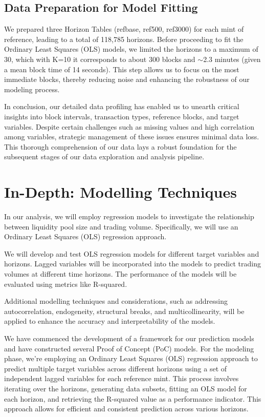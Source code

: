 \documentclass{article}
\begin{document}
\subsection{Data Preparation for Model Fitting}
We prepared three Horizon Tables (refbase, ref500, ref3000) for each mint of reference, leading to a total of 118,785 horizons. Before proceeding to fit the Ordinary Least Squares (OLS) models, we limited the horizons to a maximum of 30, which with K=10 it corresponds to about 300 blocks and $\sim$2.3 minutes (given a mean block time of 14 seconds). This step allows us to focus on the most immediate blocks, thereby reducing noise and enhancing the robustness of our modeling process.

In conclusion, our detailed data profiling has enabled us to unearth critical insights into block intervals, transaction types, reference blocks, and target variables. Despite certain challenges such as missing values and high correlation among variables, strategic management of these issues ensures minimal data loss. This thorough comprehension of our data lays a robust foundation for the subsequent stages of our data exploration and analysis pipeline.


\section*{\textbf{In-Depth: Modelling Techniques}}

In our analysis, we will employ regression models to investigate the relationship between liquidity pool size and trading volume. Specifically, we will use an Ordinary Least Squares (OLS) regression approach.

We will develop and test OLS regression models for different target variables and horizons. Lagged variables will be incorporated into the models to predict trading volumes at different time horizons. The performance of the models will be evaluated using metrics like R-squared.

Additional modelling techniques and considerations, such as addressing autocorrelation, endogeneity, structural breaks, and multicollinearity, will be applied to enhance the accuracy and interpretability of the models.


We have commenced the development of a framework for our prediction models and have constructed several Proof of Concept (PoC) models. For the modeling phase, we're employing an Ordinary Least Squares (OLS) regression approach to predict multiple target variables across different horizons using a set of independent lagged variables for each reference mint. This process involves iterating over the horizons, generating data subsets, fitting an OLS model for each horizon, and retrieving the R-squared value as a performance indicator. This approach allows for efficient and consistent prediction across various horizons.
\end{document}

